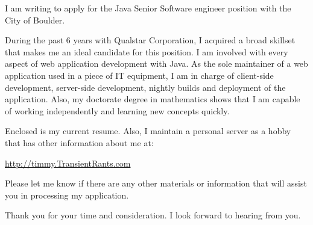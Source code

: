 \documentclass[10pt,stdletter,dateno]{newlfm}
\begin{document}
\begin{newlfm}

I am writing to apply for the Java Senior Software engineer position with the City of Boulder.

During the past 6 years with Qualstar Corporation, I acquired a broad skillset 
that makes me an ideal candidate for this position.  I am involved with every aspect of web application 
development with Java.  As the sole maintainer of a web application used in a piece of IT equipment, I am 
in charge of client-side development, server-side development, nightly builds and deployment 
of the application.  Also, my doctorate degree in mathematics shows that I am capable of working independently 
and learning new concepts quickly.

Enclosed is my current resume.  Also, I maintain a personal server as a hobby that has 
other information about me at:

\url{http://timmy.TransientRants.com}

Please let me know if there are any other materials or information that will assist you in processing my application.

Thank you for your time and consideration.  I look forward to hearing from you.

\end{newlfm}
\end{document}
